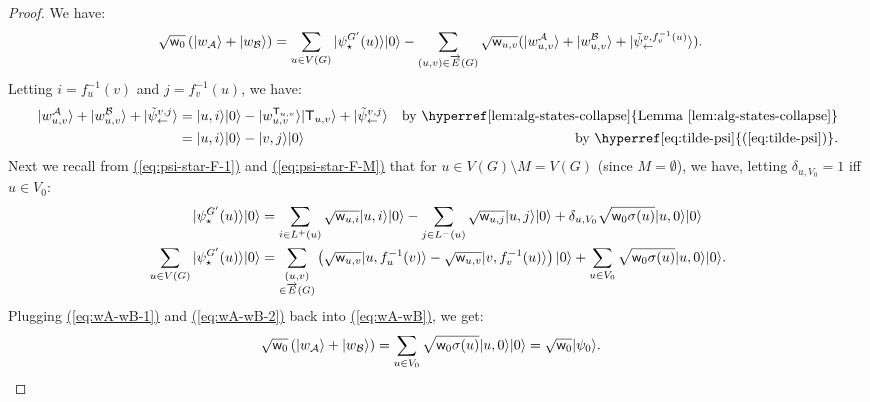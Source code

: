 \documentclass{theoretics}
\newcommand{\eq}[1]{\hyperref[eq:#1]{(\ref*{eq:#1})}}
\newcommand{\lem}[1]{\hyperref[lem:#1]{Lemma~\ref*{lem:#1}}}
\def\ket#1{{\lvert}#1\rangle}
\renewcommand{\>}{\rangle}
\newcommand{\<}{\langle}
\renewcommand{\(}{\left(}
\renewcommand{\)}{\right)}
\def\w{{\sf w}}
\begin{document}
\begin{proof}
We have:
\begin{align}
\sqrt{\w_0}\left(\ket{w_{\cal A}}+\ket{w_{\cal B}}\right) &= \sum_{u\in V(G)}\ket{\psi_{\star}^{G'}(u)}\ket{0}-\sum_{(u,v)\in\overrightarrow{E}(G)}\sqrt{\w_{u,v}}(\ket{w_{u,v}^{\cal A}}+\ket{w_{u,v}^{\cal B}}+\ket{\tilde\psi_{\leftarrow}^{v,f_v^{-1}(u)}}).\label{eq:wA-wB}
\end{align}
Letting $i=f_u^{-1}(v)$ and $j=f_v^{-1}(u)$, we have:
\begin{equation}
\begin{aligned}
\ket{w_{u,v}^{\cal A}}+\ket{w_{u,v}^{\cal B}}+\ket{\tilde\psi_{\leftarrow}^{v,j}}
&=\ket{u,i}\ket{0}-\ket{w_{u,v}^{{\sf T}_{u,v}}}\ket{{\sf T}_{u,v}}+\ket{\tilde\psi_{\leftarrow}^{v,j}}    & \mbox{by \lem{alg-states-collapse}}\\
 &= \ket{u,i}\ket{0}-\ket{v,j}\ket{0} & \mbox{by \eq{tilde-psi}}.
\end{aligned}\label{eq:wA-wB-1}
\end{equation}
Next we recall from \eq{psi-star-F-1} and \eq{psi-star-F-M} that for $u\in V(G)\setminus M=V(G)$ (since $M=\emptyset$), we have, letting $\delta_{u,V_0}=1$ iff $u\in V_0$:
\begin{equation}
\begin{split}
\ket{\psi_{\star}^{G'}(u)}\ket{0} 
&=\sum_{i\in L^+(u)}\sqrt{\w_{u,i}}\ket{u,i}\ket{0} - \sum_{j\in L^-(u)}\sqrt{\w_{u,j}}\ket{u,j}\ket{0}+\delta_{u,V_0}\sqrt{\w_0\sigma(u)}\ket{u,0}\ket{0}\\
\sum_{u\in V(G)}\ket{\psi_{\star}^{G'}(u)}\ket{0} 
&= \sum_{\substack{(u,v)\\ \in\overrightarrow{E}(G)}}\left(\sqrt{\w_{u,v}}\ket{u,f_u^{-1}(v)}-\sqrt{\w_{u,v}}\ket{v,f_v^{-1}(u)}\right)\ket{0}+\sum_{u\in V_0}\sqrt{\w_0\sigma(u)}\ket{u,0}\ket{0}.
\end{split}\label{eq:wA-wB-2}
\end{equation}
Plugging \eq{wA-wB-1} and \eq{wA-wB-2} back into \eq{wA-wB}, we get:
\begin{align*}
\sqrt{\w_0}\left(\ket{w_{\cal A}}+\ket{w_{\cal B}}\right) &= \sum_{u\in V_0}\sqrt{\w_0\sigma(u)}\ket{u,0}\ket{0}=\sqrt{\w_0}\ket{\psi_0}.\qedhere
\end{align*}
\end{proof}
\end{document}
